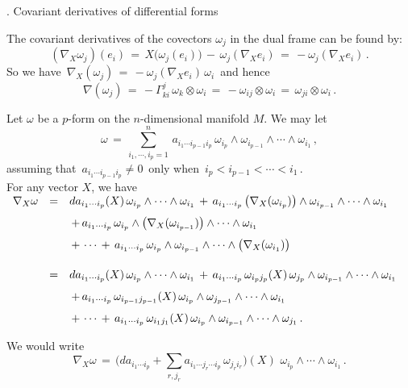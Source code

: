 \documentclass{article}[12pt,a4paper]
\begin{document}
\begin{center} {. Covariant derivatives of differential forms}\end{center}
The covariant derivatives of the covectors $\omega_j$ in the dual frame can be found by:
$$ (\nabla_X \omega_j)(e_i) \,=\, X\big(\omega_j(e_i)\big) \,-\, \omega_j(\nabla_X e_i)
\,=\, -\omega_j(\nabla_X e_i) \,. $$
So we have \,$\nabla_X(\omega_j)\,=\, -\omega_j(\nabla_X e_i)\, \omega_i$\, and hence
$$ \nabla(\omega_j) \,=\, -\Gamma_{ki}^j\, \omega_k \otimes \omega_i \,=\, 
	-\omega_{ij} \otimes \omega_i \,=\, \omega_{ji} \otimes \omega_i\,. $$

Let $\omega$ be a $p$-form on the $n$-dimensional manifold $M$. We may let 
$$ \omega \,=\, \sum_{i_1,\cdots,i_p=1}^n\, a_{i_1\cdots i_{p-1} i_p}\, \omega_{i_p}\wedge\omega_{i_{p-1}}\wedge\cdots\wedge\omega_{i_1}\,,$$
assuming that \,$a_{i_1\cdots i_{p-1} i_p} \neq 0$\, only when \,$i_p<i_{p-1}<\cdots<i_1$\,. \\

For any vector $X$, we have \\[0.1in]
$\begin{array}{rcl}
\nabla_X \omega &=& \displaystyle 
	da_{i_1\cdots i_p}(X)\, \omega_{i_p}\wedge\cdots\wedge\omega_{i_1}
	\,+\, a_{i_1\cdots i_p} \,\big(\nabla_X(\omega_{i_p})\big)\wedge\omega_{i_{p-1}}\wedge\cdots\wedge\omega_{i_1} \\[0.1in]
&& \displaystyle 
	\,+\, a_{i_1\cdots i_p}\, \omega_{i_p}\wedge \big(\nabla_X(\omega_{i_{p-1}})\big)\wedge\cdots\wedge\omega_{i_1} \\[0.1in]
&& \displaystyle
 	\,+\, \cdots \,+\, a_{i_1\cdots i_p}\, \omega_{i_p}\wedge\omega_{i_{p-1}}\wedge \cdots\wedge 
	\big( \nabla_X(\omega_{i_1})\big) \\[0.2in]
&=& \displaystyle
	da_{i_1\cdots i_p}(X)\,\omega_{i_p}\wedge\cdots\wedge\omega_{i_1} 
	\,+\, a_{i_1\cdots i_p}\,\omega_{i_pj_p}(X)\, \omega_{j_p}\wedge\omega_{i_{p-1}}\wedge\cdots\wedge\omega_{i_1} \\[0.1in]
&& \displaystyle
	\,+\, a_{i_1\cdots i_p}\,\omega_{i_{p-1}j_{p-1}}(X)\, \omega_{i_p}\wedge\omega_{j_{p-1}}\wedge\cdots\wedge\omega_{i_1} \\[0.1in]
&& \displaystyle 
	\,+\, \cdots \,+\,
	a_{i_1\cdots i_p}\, \omega_{i_1j_1}(X)\, \omega_{i_p}\wedge\omega_{i_{p-1}}\wedge\cdots\wedge \omega_{j_1} \,.
\end{array}$ \\
\newpage

We would write
$$ \nabla_X \omega \,=\, 
	\big(da_{i_1\cdots i_p} + \sum_{r, j_r} a_{i_1\cdots j_r\cdots i_p}\, \omega_{j_r i_r}\big)(X) 
	\,\,\omega_{i_p}\wedge\cdots\wedge\omega_{i_1}\,.  $$
\end{document}
